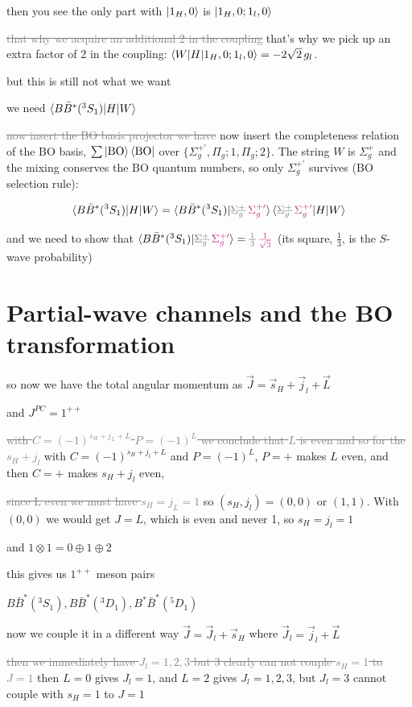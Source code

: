 \documentclass[11pt,a4paper]{article}
\newcommand{\ai}[1]{\textcolor{aicolor}{#1}}
\newcommand{\aifix}[2]{\textcolor{gray}{\sout{#1}} \textcolor{aicolor}{#2}}
\newcommand{\aifixm}[2]{\textcolor{gray}{\text{\sout{$#1$}}}\,\textcolor{aicolor}{#2}}
\newcommand{\ai}[1]{#1}
\newcommand{\aifix}[2]{#2}
\newcommand{\aifixm}[2]{#2}
\begin{document}
then you see the only part with $\ket{1_H,0}$ is $\ket{1_H,0;1_l,0}$

\aifix{that why we acquire an additional 2 in the coupling}{that's why we pick up an extra factor of 2 in the coupling: $\braket{W|H|1_H,0;1_l,0}=-2\sqrt2\,g_l$.}

but this is still not what we want

we need $\braket{B\bar{B}^* (^3S_1)|H|W}$

\aifix{now insert the BO basis projector we have}{now insert the completeness relation of the BO basis, $\sum\ket{\rm BO}\bra{\rm BO}$ over $\{\Sigma_g^{+\prime},\Pi_g;1,\Pi_g;2\}$. The string $W$ is $\Sigma_g^+$ and the mixing conserves the BO quantum numbers, so only $\Sigma_g^{+\prime}$ survives (BO selection rule):}

$$\braket{B\bar{B}^* (^3S_1)|H|W} = \braket{B\bar{B}^* (^3S_1)|\aifixm{\Sigma_g^+}{\Sigma_g^{+\prime}} }\braket{\aifixm{\Sigma_g^+}{\Sigma_g^{+\prime}} |H|W}$$

and we need to show that $\braket{B\bar{B}^* (^3S_1)|\aifixm{\Sigma_g^+}{\Sigma_g^{+\prime}} } = \aifixm{\frac{1}{3}}{\frac{1}{\sqrt3}}$ \ai{(its square, $\frac13$, is the $S$-wave probability)}

\section{Partial-wave channels and the BO transformation}

so now we have the total angular momentum as $\vec{J} = \vec{s}_H + \vec{j}_l + \vec{L}$

and $J^{PC} = 1^{++}$

\aifix{with $C = (-1)^{s_H + j_L + L}$ $P = (-1)^L$ we conclude that $L$ is even and so for the $s_H + j_l$}{with $C=(-1)^{s_H+j_l+L}$ and $P=(-1)^L$, $P=+$ makes $L$ even, and then $C=+$ makes $s_H+j_l$ even,}

\aifix{since L even we must have $s_H = j_L = 1$}{so $(s_H,j_l)=(0,0)$ or $(1,1)$. With $(0,0)$ we would get $J=L$, which is even and never 1, so $s_H=j_l=1$}

and $1\otimes 1 = 0 \oplus 1 \oplus 2  $

this gives us $1^{++}$ meson pairs

$B\bar{B}^*(^3S_1), B\bar{B}^*(^3D_1), B^*\bar{B}^*(^5D_1)$

now we couple it in a different way $\vec{J} = \vec{J}_l + \vec{s}_H$ where $\vec{J}_l = \vec{j}_l + \vec{L}$

\aifix{then we immediately have $J_l = 1, 2, 3$ but 3 clearly can not couple $s_H = 1$ to $J = 1$}{then $L=0$ gives $J_l=1$, and $L=2$ gives $J_l=1,2,3$, but $J_l=3$ cannot couple with $s_H=1$ to $J=1$}
\end{document}

